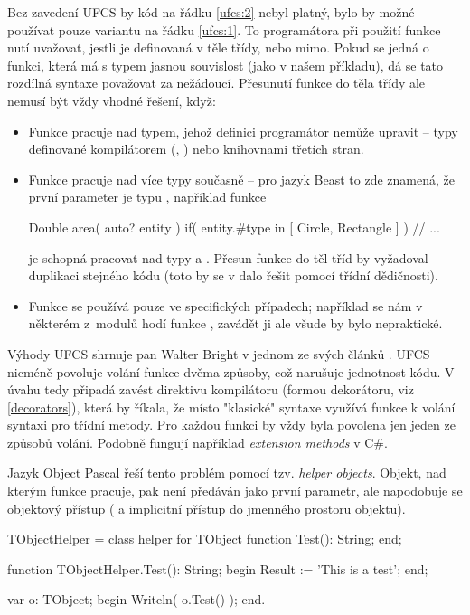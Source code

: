 Bez zavedení UFCS by kód na řádku \ref{ufcs:2} nebyl platný, bylo by možné používat pouze variantu na řádku \ref{ufcs:1}. To programátora při použití funkce nutí uvažovat, jestli je definovaná v těle třídy, nebo mimo. Pokud se jedná o funkci, která má s typem jasnou souvislost (jako v našem příkladu), dá se tato rozdílná syntaxe považovat za nežádoucí. Přesunutí funkce do těla třídy ale nemusí být vždy vhodné řešení, když:
\begin{itemize}
	\item Funkce pracuje nad typem, jehož definici programátor nemůže upravit -- typy definované kompilátorem (, ) nebo knihovnami třetích stran.
	\item Funkce pracuje nad více typy současně --  pro jazyk Beast to zde znamená, že první parameter je typu , například funkce
		\begin{code}
Double area( auto? entity )
	if( entity.#type in [ Circle, Rectangle ] )
{
	// ...
}
		\end{code}
		je schopná pracovat nad typy  a . Přesun funkce do těl tříd by vyžadoval duplikaci stejného kódu (toto by se v dalo řešit pomocí třídní dědičnosti).
	\item Funkce se používá pouze ve specifických případech; například se nám v některém z~modulů hodí funkce , zavádět ji ale všude by bylo nepraktické.
\end{itemize}

Výhody UFCS shrnuje pan Walter Bright v jednom ze svých článků \cite{Bright2002}. UFCS nicméně povoluje volání funkce dvěma způsoby, což narušuje jednotnost kódu. V úvahu tedy připadá zavést direktivu kompilátoru (formou dekorátoru, viz \ref{decorators}), která by říkala, že místo "klasické" syntaxe využívá funkce k volání syntaxi pro třídní metody. Pro každou funkci by vždy byla povolena jen jeden ze způsobů volání. Podobně fungují například \textit{extension methods} v C\#.

Jazyk Object Pascal řeší tento problém pomocí tzv. \textit{helper objects}. Objekt, nad kterým funkce pracuje, pak není předáván jako první parametr, ale napodobuje se objektový přístup ( a implicitní přístup do jmenného prostoru objektu).
\begin{pascalcode}
TObjectHelper = class helper for TObject
	function Test(): String;
end;

function TObjectHelper.Test(): String;
begin
	Result := 'This is a test';
end;

var
	o: TObject;
begin
	Writeln( o.Test() );
end.
\end{pascalcode}

